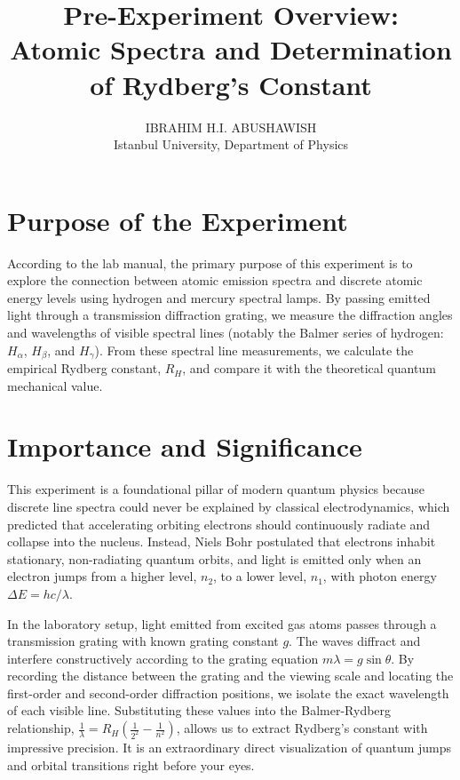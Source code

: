 \documentclass[11pt,a4paper]{article}
\title{\textbf{Pre-Experiment Overview:\\ Atomic Spectra and Determination of Rydberg's Constant}}
\author{IBRAHIM H.I. ABUSHAWISH \\ Istanbul University, Department of Physics}
\date{}
\begin{document}
\maketitle

\section*{Purpose of the Experiment}
According to the lab manual, the primary purpose of this experiment is to explore the connection between atomic emission spectra and discrete atomic energy levels using hydrogen and mercury spectral lamps. By passing emitted light through a transmission diffraction grating, we measure the diffraction angles and wavelengths of visible spectral lines (notably the Balmer series of hydrogen: $H_\alpha$, $H_\beta$, and $H_\gamma$). From these spectral line measurements, we calculate the empirical Rydberg constant, $R_H$, and compare it with the theoretical quantum mechanical value.

\section*{Importance and Significance}
This experiment is a foundational pillar of modern quantum physics because discrete line spectra could never be explained by classical electrodynamics, which predicted that accelerating orbiting electrons should continuously radiate and collapse into the nucleus. Instead, Niels Bohr postulated that electrons inhabit stationary, non-radiating quantum orbits, and light is emitted only when an electron jumps from a higher level, $n_2$, to a lower level, $n_1$, with photon energy $\Delta E = h c / \lambda$.

In the laboratory setup, light emitted from excited gas atoms passes through a transmission grating with known grating constant $g$. The waves diffract and interfere constructively according to the grating equation $m \lambda = g \sin\theta$. By recording the distance between the grating and the viewing scale and locating the first-order and second-order diffraction positions, we isolate the exact wavelength of each visible line. Substituting these values into the Balmer-Rydberg relationship, $\frac{1}{\lambda} = R_H \left(\frac{1}{2^2} - \frac{1}{n^2}\right)$, allows us to extract Rydberg's constant with impressive precision. It is an extraordinary direct visualization of quantum jumps and orbital transitions right before your eyes.
\end{document}
